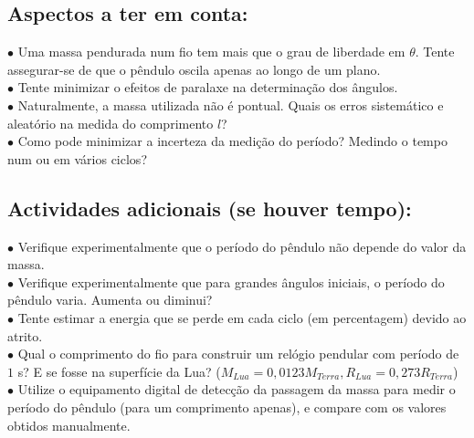 \documentclass[a4paper,twoside,12pt]{article}      %
\begin{document}
\smallskip

\subsection{\sf Aspectos a ter em conta:}

 \begin{flushleft}
	 $\bullet$ Uma massa pendurada num fio tem mais que o grau de liberdade em $\theta$. Tente assegurar-se de que o pêndulo oscila apenas ao longo de um plano. \\
	 $\bullet$ Tente minimizar o efeitos de paralaxe na determinação dos ângulos.\\
	 $\bullet$ Naturalmente, a massa utilizada não é pontual. Quais os erros sistemático e aleatório na medida do comprimento $l$? \\	
	 $\bullet$ Como pode minimizar a incerteza da medição do período? Medindo o tempo num ou em vários ciclos? \\
\end{flushleft} 

\subsection{\sf Actividades adicionais (se houver tempo):}

 \begin{flushleft}
	 $\bullet$ Verifique experimentalmente que o período do pêndulo não depende do valor da massa.\\
	 $\bullet$ Verifique experimentalmente que para grandes ângulos iniciais, o período do pêndulo varia. Aumenta ou diminui?\\
	 $\bullet$ Tente estimar a energia que se perde em cada ciclo (em percentagem) devido ao atrito.\\
	 $\bullet$ Qual o comprimento do fio para construir um relógio pendular com período de $1$ s? 
	 E se fosse na superfície da Lua? ($M_{Lua}=0,0123 M_{Terra}, R_{Lua}=0,273 R_{Terra}$)\\
	 $\bullet$ Utilize o equipamento digital de detecção da passagem da massa para medir o período do pêndulo (para um comprimento apenas), e compare com os valores obtidos manualmente.
\end{flushleft} 

\end{document}
